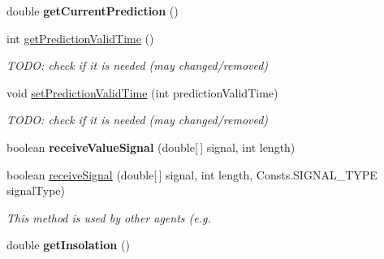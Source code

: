 \begin{DoxyCompactItemize}
\item 
\hypertarget{classuk_1_1ac_1_1dmu_1_1iesd_1_1cascade_1_1agents_1_1prosumers_1_1_prosumer_agent_a0848bca3b79f035dbe4822521476903b}{double {\bfseries get\-Current\-Prediction} ()}\label{classuk_1_1ac_1_1dmu_1_1iesd_1_1cascade_1_1agents_1_1prosumers_1_1_prosumer_agent_a0848bca3b79f035dbe4822521476903b}

\item 
int \hyperlink{classuk_1_1ac_1_1dmu_1_1iesd_1_1cascade_1_1agents_1_1prosumers_1_1_prosumer_agent_ac2fa83c431ddc08a6e0276d769b51a16}{get\-Prediction\-Valid\-Time} ()
\begin{DoxyCompactList}\small\item\em T\-O\-D\-O\-: check if it is needed (may changed/removed) \end{DoxyCompactList}\item 
void \hyperlink{classuk_1_1ac_1_1dmu_1_1iesd_1_1cascade_1_1agents_1_1prosumers_1_1_prosumer_agent_a72af97b7c3f1c8ce5405e4aa8f030e9f}{set\-Prediction\-Valid\-Time} (int prediction\-Valid\-Time)
\begin{DoxyCompactList}\small\item\em T\-O\-D\-O\-: check if it is needed (may changed/removed) \end{DoxyCompactList}\item 
\hypertarget{classuk_1_1ac_1_1dmu_1_1iesd_1_1cascade_1_1agents_1_1prosumers_1_1_prosumer_agent_a11e584d7bbbfac538ac71fa00d7ce634}{boolean {\bfseries receive\-Value\-Signal} (double\mbox{[}$\,$\mbox{]} signal, int length)}\label{classuk_1_1ac_1_1dmu_1_1iesd_1_1cascade_1_1agents_1_1prosumers_1_1_prosumer_agent_a11e584d7bbbfac538ac71fa00d7ce634}

\item 
boolean \hyperlink{classuk_1_1ac_1_1dmu_1_1iesd_1_1cascade_1_1agents_1_1prosumers_1_1_prosumer_agent_ab740c584d81eae3bde0a6043ad818c42}{receive\-Signal} (double\mbox{[}$\,$\mbox{]} signal, int length, Consts.\-S\-I\-G\-N\-A\-L\-\_\-\-T\-Y\-P\-E signal\-Type)
\begin{DoxyCompactList}\small\item\em This method is used by other agents (e.\-g. \end{DoxyCompactList}\item 
\hypertarget{classuk_1_1ac_1_1dmu_1_1iesd_1_1cascade_1_1agents_1_1prosumers_1_1_prosumer_agent_ab810411572cef8469a62fddda7248551}{double {\bfseries get\-Insolation} ()}\label{classuk_1_1ac_1_1dmu_1_1iesd_1_1cascade_1_1agents_1_1prosumers_1_1_prosumer_agent_ab810411572cef8469a62fddda7248551}


\end{DoxyCompactItemize}
